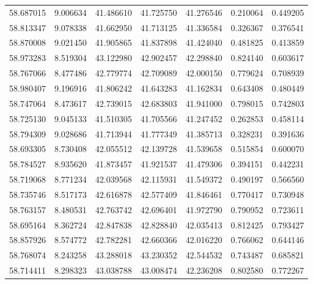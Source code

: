 \begin{tabular}{rrrrrrr}
 58.687015 &   9.006634 &         41.486610 &         41.725750 &         41.276546 &  0.210064 &  0.449205 \\
 58.813347 &   9.078338 &         41.662950 &         41.713125 &         41.336584 &  0.326367 &  0.376541 \\
 58.870008 &   9.021450 &         41.905865 &         41.837898 &         41.424040 &  0.481825 &  0.413859 \\
 58.973283 &   8.519304 &         43.122980 &         42.902457 &         42.298840 &  0.824140 &  0.603617 \\
 58.767066 &   8.477486 &         42.779774 &         42.709089 &         42.000150 &  0.779624 &  0.708939 \\
 58.980407 &   9.196916 &         41.806242 &         41.643283 &         41.162834 &  0.643408 &  0.480449 \\
 58.747064 &   8.473617 &         42.739015 &         42.683803 &         41.941000 &  0.798015 &  0.742803 \\
 58.725130 &   9.045133 &         41.510305 &         41.705566 &         41.247452 &  0.262853 &  0.458114 \\
 58.794309 &   9.028686 &         41.713944 &         41.777349 &         41.385713 &  0.328231 &  0.391636 \\
 58.693305 &   8.730408 &         42.055512 &         42.139728 &         41.539658 &  0.515854 &  0.600070 \\
 58.784527 &   8.935620 &         41.873457 &         41.921537 &         41.479306 &  0.394151 &  0.442231 \\
 58.719068 &   8.771234 &         42.039568 &         42.115931 &         41.549372 &  0.490197 &  0.566560 \\
 58.735746 &   8.517173 &         42.616878 &         42.577409 &         41.846461 &  0.770417 &  0.730948 \\
 58.763157 &   8.480531 &         42.763742 &         42.696401 &         41.972790 &  0.790952 &  0.723611 \\
 58.695164 &   8.362724 &         42.847838 &         42.828840 &         42.035413 &  0.812425 &  0.793427 \\
 58.857926 &   8.574772 &         42.782281 &         42.660366 &         42.016220 &  0.766062 &  0.644146 \\
 58.768074 &   8.243258 &         43.288018 &         43.230352 &         42.544532 &  0.743487 &  0.685821 \\
 58.714411 &   8.298323 &         43.038788 &         43.008474 &         42.236208 &  0.802580 &  0.772267 \\

\end{tabular}
